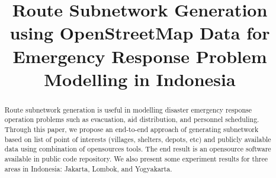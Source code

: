 \documentclass[conference]{IEEEtran}
\begin{document}
\title{Route Subnetwork Generation using OpenStreetMap Data for Emergency Response Problem Modelling in Indonesia
}

\author{
\and
{}
}

\maketitle

\begin{abstract}
Route subnetwork generation is useful in modelling disaster emergency response operation problems such as evacuation, aid distribution, and personnel scheduling. Through this paper, we propose an end-to-end approach of generating subnetwork based on list of point of interests (villages, shelters, depots, etc) and publicly available data using combination of opensources tools. The end result is an opensource software available in public code repository. We also present some experiment results for three areas in Indonesia: Jakarta, Lombok, and Yogyakarta.
\end{abstract}
\end{document}

